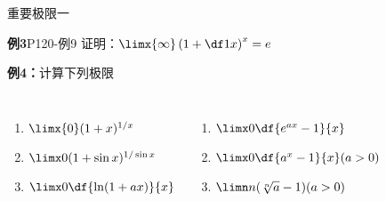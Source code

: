
\begin{frame}{重要极限一}
	\linespread{1.2}
	\begin{alertblock}{{\bf 例3}\hfill P120-例9}
		证明：$\limx{\infty}\left(1+\df 1x\right)^x=e$
	\end{alertblock}\pause 
	\begin{exampleblock}{{\bf 例4：}计算下列极限\hfill}\pause 
		\begin{columns}
				\begin{enumerate}
				  \item $\limx{0}(1+x)^{1/x}$\pause 
				  \item $\limx 0(1+\sin x)^{1/\sin x}$\pause 
				  \item $\limx 0\df{\ln(1+ax)}{x}$\pause 
				\end{enumerate}
				\begin{enumerate}
				  \addtocounter{enumi}{3}
				  \item $\limx 0\df{e^{ax}-1}{x}$\pause 
				  \item $\limx 0\df{a^x-1}{x}(a>0)$\pause 
				  \item $\limn n(\sqrt[n]{a}-1) (a>0)$
				\end{enumerate}
		\end{columns}
	\end{exampleblock}
\end{frame}


